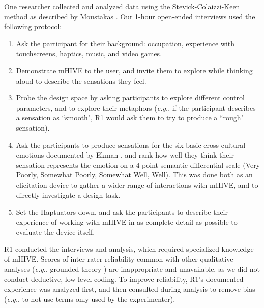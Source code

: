 One researcher collected and analyzed data using the Stevick-Colaizzi-Keen method as described by Moustakas \cite{Moustakas1994}.
Our 1-hour open-ended interviews
used the following protocol:
\begin{enumerate}
	\item Ask the participant for their background: occupation, experience with touchscreens, haptics, music, and video games.
	\item Demonstrate mHIVE to the user, and invite them to explore while thinking aloud to describe the sensations they feel.
	\item Probe the design space by asking participants to explore different control parameters, and to explore their metaphors (\emph{e.g.}, if the participant describes a sensation as ``smooth", R1 would ask them to try to produce a ``rough" sensation).
	\item Ask the participants to produce sensations for the six basic cross-cultural emotions documented by Ekman \cite{Ekman1992}, and rank how well they think their sensation represents the emotion on a 4-point semantic differential scale (Very Poorly, Somewhat Poorly, Somewhat Well, Well). This was done both as an elicitation device to gather a wider range of interactions with mHIVE, and to directly investigate a design task.
	\item Set the Haptuators down, and ask the participants to describe their experience of working with mHIVE in as complete detail as possible to evaluate the device itself.
\end{enumerate}

\noindent
R1 conducted the interviews and analysis, which required specialized knowledge of mHIVE.
Scores of inter-rater reliability common with other qualitative analyses (\emph{e.g.}, grounded theory \cite{Corbin2008}) are inappropriate and unavailable, as we did not conduct deductive, low-level coding.
To improve reliability,  R1's documented experience was analyzed first, and then consulted during analysis to remove bias (\emph{e.g.}, to not use terms only used by the experimenter).

